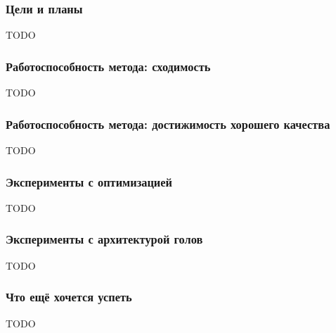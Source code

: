 \documentclass[aspectratio=169]{beamer}
\begin{document}
\section[Исследование многозадачных трансформеров]{}

\begin{frame}
	\frametitle{Цели и планы}
	TODO
\end{frame}

\begin{frame}
	\frametitle{Работоспособность метода: сходимость}
	TODO
\end{frame}


\begin{frame}
	\frametitle{Работоспособность метода: достижимость хорошего качества}
	TODO
\end{frame}

\begin{frame}
	\frametitle{Эксперименты с оптимизацией}
	TODO
\end{frame}
	
\begin{frame}
	\frametitle{Эксперименты с архитектурой голов}
	TODO
\end{frame}

\begin{frame}
	\frametitle{Что ещё хочется успеть}
	TODO
\end{frame}
\end{document}
